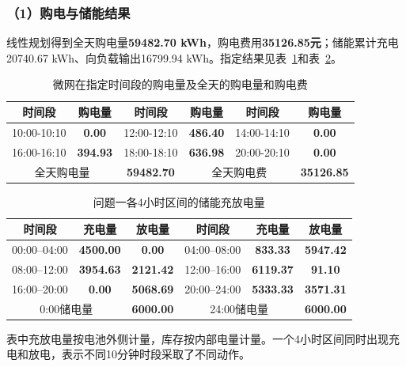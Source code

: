 \subsubsection*{（1）购电与储能结果}
线性规划得到全天购电量\textbf{59482.70 kWh}，购电费用\textbf{35126.85元}；储能累计充电20740.67 kWh、向负载输出16799.94 kWh。指定结果见表~\ref{tab:q1_purchase_result}和表~\ref{tab:q1_storage_result}。
\begin{table}[H]
    \centering
    \caption{微网在指定时间段的购电量及全天的购电量和购电费 }
    \label{tab:q1_purchase_result}
    \begin{tabular}{|c|c|c|c|c|c|}
        \hline
        时间段 & 购电量 & 时间段 & 购电量 & 时间段 & 购电量 \\
        \hline
        10:00-10:10 & \textbf{0.00} & 12:00-12:10 & \textbf{486.40} & 14:00-14:10 & \textbf{0.00} \\
        \hline
        16:00-16:10 & \textbf{394.93} & 18:00-18:10 & \textbf{636.98} & 20:00-20:10 & \textbf{0.00} \\
        \hline
        \multicolumn{2}{|c|}{全天购电量} & \multicolumn{1}{c|}{\textbf{59482.70}} & \multicolumn{2}{c|}{全天购电费} & \multicolumn{1}{c|}{\textbf{35126.85}}\\
        \hline
    \end{tabular}
\end{table}
\begin{table}[H]
    \centering
    \caption{问题一各4小时区间的储能充放电量}
    \label{tab:q1_storage_result}
    \begin{tabular}{|c|c|c|c|c|c|}
        \hline
        时间段 & 充电量 & 放电量 & 时间段 & 充电量 & 放电量 \\
        \hline
        00:00--04:00 & \textbf{4500.00} & \textbf{0.00} & 04:00--08:00 & \textbf{833.33} & \textbf{5947.42} \\
        \hline
        08:00--12:00 & \textbf{3954.63} & \textbf{2121.42} & 12:00--16:00 & \textbf{6119.37} & \textbf{91.10} \\
        \hline
        16:00--20:00 & \textbf{0.00} & \textbf{5068.69} & 20:00--24:00 & \textbf{5333.33} & \textbf{3571.31} \\
        \hline
        \multicolumn{2}{|c|}{0:00储电量} & \multicolumn{1}{|c|}{\textbf{6000.00}} & \multicolumn{2}{c|}{24:00储电量} & \multicolumn{1}{c|}{\textbf{6000.00}}\\
        \hline
    \end{tabular}
\end{table}
表中充放电量按电池外侧计量，库存按内部电量计量。一个4小时区间同时出现充电和放电，表示不同10分钟时段采取了不同动作。

